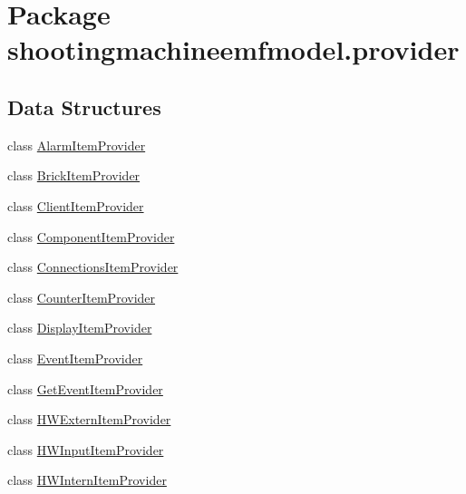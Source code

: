 \hypertarget{namespaceshootingmachineemfmodel_1_1provider}{\section{Package shootingmachineemfmodel.\-provider}
\label{namespaceshootingmachineemfmodel_1_1provider}
}
\subsection*{Data Structures}
\begin{DoxyCompactItemize}
\item 
class \hyperlink{classshootingmachineemfmodel_1_1provider_1_1_alarm_item_provider}{Alarm\-Item\-Provider}
\item 
class \hyperlink{classshootingmachineemfmodel_1_1provider_1_1_brick_item_provider}{Brick\-Item\-Provider}
\item 
class \hyperlink{classshootingmachineemfmodel_1_1provider_1_1_client_item_provider}{Client\-Item\-Provider}
\item 
class \hyperlink{classshootingmachineemfmodel_1_1provider_1_1_component_item_provider}{Component\-Item\-Provider}
\item 
class \hyperlink{classshootingmachineemfmodel_1_1provider_1_1_connections_item_provider}{Connections\-Item\-Provider}
\item 
class \hyperlink{classshootingmachineemfmodel_1_1provider_1_1_counter_item_provider}{Counter\-Item\-Provider}
\item 
class \hyperlink{classshootingmachineemfmodel_1_1provider_1_1_display_item_provider}{Display\-Item\-Provider}
\item 
class \hyperlink{classshootingmachineemfmodel_1_1provider_1_1_event_item_provider}{Event\-Item\-Provider}
\item 
class \hyperlink{classshootingmachineemfmodel_1_1provider_1_1_get_event_item_provider}{Get\-Event\-Item\-Provider}
\item 
class \hyperlink{classshootingmachineemfmodel_1_1provider_1_1_h_w_extern_item_provider}{H\-W\-Extern\-Item\-Provider}
\item 
class \hyperlink{classshootingmachineemfmodel_1_1provider_1_1_h_w_input_item_provider}{H\-W\-Input\-Item\-Provider}
\item 
class \hyperlink{classshootingmachineemfmodel_1_1provider_1_1_h_w_intern_item_provider}{H\-W\-Intern\-Item\-Provider}
\item 

\end{DoxyCompactItemize}
